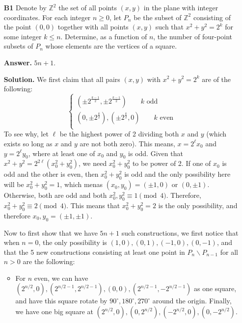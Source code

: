 \documentclass[11pt,a4paper]{article}
\newcommand{\<}{\langle}
\renewcommand{\>}{\rangle}
\begin{document}
\begin{enumerate}
	\item [\textbf{B1}] Denote by $\mathbb Z^2$ the set of all points $(x,y)$ in the plane with integer coordinates.  For each integer $n\geq 0$, let $P_n$ be the subset of $\mathbb Z^2$ consisting of the point $(0,0)$ together with all points $(x,y)$ such that $x^2+y^2=2^k$ for some integer $k\leq n$.  Determine, as a function of $n$, the number of four-point subsets of $P_n$ whose elements are the vertices of a square.
	
	\textbf{Answer.} $5n + 1$. 
	
	\textbf{Solution.} We first claim that all pairs $(x, y)$ with $x^2+y^2=2^k$ are of the following: 
	\[
	\begin{cases}
	(\pm 2^{\frac{k-1}{2}}, \pm 2^{\frac{k-1}{2}})\qquad k\text{ odd}\\
	(0, \pm 2^{\frac k2}), (\pm 2^{\frac k2}, 0)\qquad k\text{ even}\\
	\end{cases}
	\]
	To see why, let $\ell$ be the highest power of 2 dividing both $x$ and $y$ (which exists so long as $x$ and $y$ are not both zero). 
	This means, $x=2^{\ell}x_0$ and $y=2^{\ell}y_0$, where at least one of $x_0$ and $y_0$ is odd. 
	Given that $x^2+y^2=2^{2\ell}(x_0^2+y_0^2)$, we need $x_0^2+y_0^2$ to be power of 2. 
	If one of $x_0$ is odd and the other is even, then $x_0^2+y_0^2$ is odd and the only possibility here will be $x_0^2+y_0^2=1$, which menas $(x_0, y_0)=(\pm 1, 0)$ or $(0, \pm 1)$. 
	Otherwise, both are odd and both $x_0^2, y_0^2\equiv 1\pmod{4}$. 
	Therefore, $x_0^2+y_0^2\equiv 2\pmod{4}$. This means that $x_0^2+y_0^2=2$ is the only possibility, and therefore $x_0, y_0=(\pm 1, \pm 1)$. 
	
	Now to first show that we have $5n+1$ such constructions, we first notice that when $n=0$, the only possibility is $(1, 0), (0, 1), (-1, 0), (0, -1)$, and that the 5 new constructions consisting at least one point in $P_n\backslash P_{n-1}$ for all $n>0$ are the following: 
	\begin{itemize}
		\item For $n$ even, we can have $(2^{n/2}, 0), (2^{n/2-1}, 2^{n/2-1}), (0, 0), (2^{n/2-1}, -2^{n/2-1})$ as one square, and have this square rotate by $90^{\circ}, 180^{\circ}, 270^{\circ}$ around the origin. Finally, we have one big square at $(2^{n/2}, 0), (0, 2^{n/2}), (-2^{n/2}, 0), (0, -2^{n/2})$. 
		

\end{itemize}
\end{enumerate}
\end{document}
